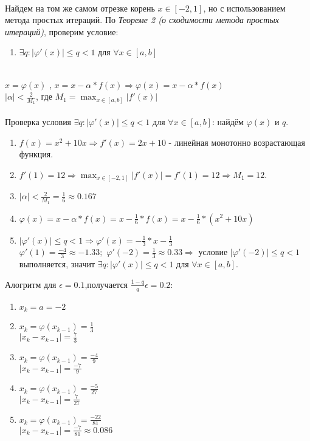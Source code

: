 \documentclass{article}
\begin{document}
	\paragraph{}Найдем на том же самом отрезке корень $x \in [-2, 1]$, но с использованием метода простых итераций.
	По \emph{ Теореме 2 (о сходимости метода простых итераций)}, проверим условие: 
	\begin{enumerate}
		\item $\exists q: |\varphi'(x)|\leq q<1$ для $\forall x \in [a, b]$
	\end{enumerate}
	~\\	
	$x = \varphi(x)$ , $x = x - \alpha*f(x) \Rightarrow \varphi(x) = x - \alpha * f(x)$
	~\\
	$|\alpha| < \frac{2} {M_1}$, где $M_1 = \max_{x \in{[a, b]}} |f'(x)|$
	~\\
	~\\
	Проверка условия $\exists q: |\varphi'(x)|\leq q<1$ для $\forall x \in [a, b]$: найдём $\varphi(x)$ и $ q$.  
	\begin{enumerate}
		\item $f(x) = x^2 + 10x \Rightarrow f'(x) = 2x + 10 $ - линейная монотонно возрастающая функция.
		\item $f'(1) = 12 \Rightarrow \max_{x \in{[-2, 1]}} |f'(x)| = f'(1) = 12 \Rightarrow M_1 = 12$.
		\item $|\alpha| < \frac{2} {M_1} = \frac{1}{6} \approx 0.167$
		\item $\varphi(x) = x - \alpha*f(x) = x -  \frac{1}{6} * f(x) = x - \frac{1}{6} * (x^2 + 10x) $
		\item $|\varphi'(x)|\leq q<1 \Rightarrow \varphi'(x) = -  \frac{1}{3}*x - \frac{1}{3} $
		~\\
		$\varphi'(1) = \frac{-4}{3} \approx -1.33;$ $ \varphi'(-2) = \frac{1}{3} \approx 0.33 \Rightarrow$ условие $|\varphi'(-2)|\leq q<1$ выполняется, значит $\exists q: |\varphi'(x)|\leq q<1$ для $\forall x \in [a, b]$.
	\end{enumerate}
	Алогритм для $\epsilon = 0.1$,получается $\frac{1-q}{q}\epsilon = 0.2$:
	\begin{enumerate}
	\item $x_k = a = -2$	
	\item $x_k = \varphi(x_{k-1}) = \frac{1}{3}$
	~\\ $|x_k - x_{k-1}| = \frac{7}{3}$
	\item $x_k = \varphi(x_{k-1}) = \frac{-4}{9}$ 
	~\\	$|x_k - x_{k-1}| = \frac{-7}{9}$
	\item $x_k = \varphi(x_{k-1}) = \frac{-5}{27}$ 
	~\\	$|x_k - x_{k-1}| = \frac{7}{27}$
	\item $x_k = \varphi(x_{k-1}) = \frac{-22}{81}$ 
	~\\	$|x_k - x_{k-1}| = \frac{-7}{81} \approx 0.086$
	\end{enumerate}	
\end{document}
